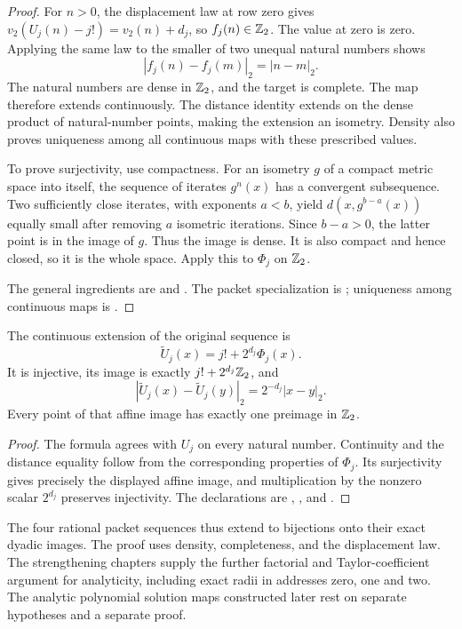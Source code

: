 \begin{proof}
For $n>0$, the displacement law at row zero gives
$v_2(U_j(n)-j!)=v_2(n)+d_j$, so $f_j(n)\in\mathbb Z_2$.
The value at zero is zero.  Applying the same law to the smaller of two
unequal natural numbers shows
\[
 |f_j(n)-f_j(m)|_2=|n-m|_2.
\]
The natural numbers are dense in $\mathbb Z_2$, and the target is complete.
The map therefore extends continuously.  The distance identity extends
on the dense product of natural-number points, making the extension
an isometry.  Density also proves uniqueness among all continuous maps
with these prescribed values.

To prove surjectivity, use compactness.  For an isometry $g$ of a compact
metric space into itself, the sequence of iterates $g^n(x)$ has a
convergent subsequence.  Two sufficiently close iterates, with exponents
$a<b$, yield $d(x,g^{b-a}(x))$ equally small after removing $a$ isometric
iterations.  Since $b-a>0$, the latter point is in the image of $g$.
Thus the image is dense.  It is also compact and hence closed, so it is
the whole space.  Apply this to $\Phi_j$ on $\mathbb Z_2$.

The general ingredients are
 and
.
The packet specialization is
;
uniqueness among continuous maps is
.
\end{proof}

\begin{corollary}
\label{cor:arith-affine-image}
The continuous extension of the original sequence is
\[
 \widetilde U_j(x)=j!+2^{d_j}\Phi_j(x).
\]
It is injective, its image is exactly $j!+2^{d_j}\mathbb Z_2$, and
\[
 |\widetilde U_j(x)-\widetilde U_j(y)|_2
     =2^{-d_j}|x-y|_2.
\]
Every point of that affine image has exactly one preimage in $\mathbb Z_2$.
\end{corollary}

\begin{proof}
The formula agrees with $U_j$ on every natural number.  Continuity and
the distance equality follow from the corresponding properties of
$\Phi_j$.  Its surjectivity gives precisely the displayed affine image,
and multiplication by the nonzero scalar $2^{d_j}$ preserves injectivity.
The declarations are
,
, and
.
\end{proof}

The four rational packet sequences thus extend to bijections onto their
exact dyadic images.  The proof uses density, completeness, and the
displacement law. The strengthening chapters supply the further factorial and Taylor-coefficient argument for analyticity, including exact radii in addresses zero, one and two.  The analytic polynomial solution maps constructed
later rest on separate hypotheses and a separate proof.
